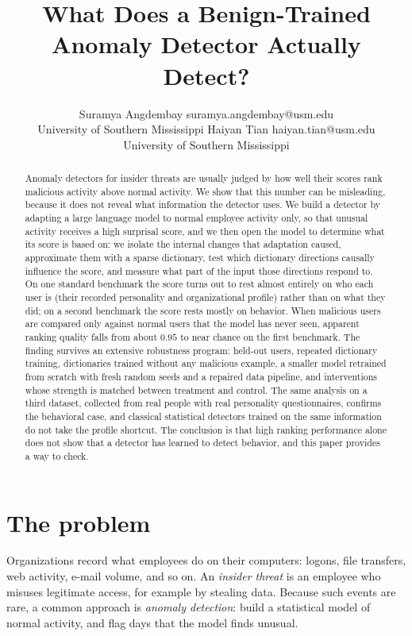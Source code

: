 \documentclass[10pt]{article}
\title{What Does a Benign-Trained Anomaly Detector Actually Detect?}
\author{\name Suramya Angdembay \email suramya.angdembay@usm.edu \\
\addr University of Southern Mississippi
\AND
\name Haiyan Tian \email haiyan.tian@usm.edu \\
\addr University of Southern Mississippi}
\begin{document}
\maketitle

\begin{abstract}
Anomaly detectors for insider threats are usually judged by how well
their scores rank malicious activity above normal activity. We show that
this number can be misleading, because it does not reveal what
information the detector uses. We build a detector by adapting a large
language model to normal employee activity only, so that unusual
activity receives a high surprisal score, and we then open the model to
determine what its score is based on: we isolate the internal changes
that adaptation caused, approximate them with a sparse dictionary, test
which dictionary directions causally influence the score, and measure
what part of the input those directions respond to. On one standard
benchmark the score turns out to rest almost entirely on who each user
is (their recorded personality and organizational profile) rather than
on what they did; on a second benchmark the score rests mostly on
behavior. When malicious users are compared only against normal users
that the model has never seen, apparent ranking quality falls from about
$0.95$ to near chance on the first benchmark. The finding survives an
extensive robustness program: held-out users, repeated dictionary
training, dictionaries trained without any malicious example, a smaller
model retrained from scratch with fresh random seeds and a repaired data
pipeline, and interventions whose strength is matched between treatment
and control. The same analysis on a third dataset, collected from real
people with real personality questionnaires, confirms the behavioral
case, and classical statistical detectors trained on the same
information do not take the profile shortcut. The conclusion is that
high ranking performance alone does not show that a detector has learned
to detect behavior, and this paper provides a way to check.
\end{abstract}

\section{The problem}

Organizations record what employees do on their computers: logons, file
transfers, web activity, e-mail volume, and so on. An \emph{insider
threat} is an employee who misuses legitimate access, for example by
stealing data. Because such events are rare, a common approach is
\emph{anomaly detection}: build a statistical model of normal activity,
and flag days that the model finds unusual.
\end{document}
